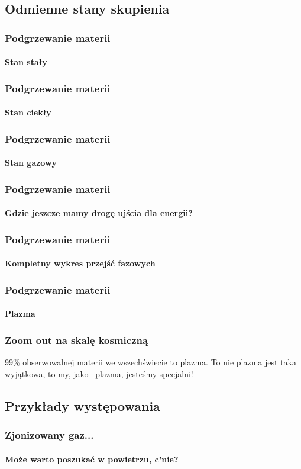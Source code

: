 \documentclass{beamer}
\begin{document}
  \subsection{Odmienne stany skupienia}
  \begin{frame}
    \frametitle{Podgrzewanie materii}
    \framesubtitle{Stan stały}
  \end{frame}

  \begin{frame}
    \frametitle{Podgrzewanie materii}
    \framesubtitle{Stan ciekły}
  \end{frame}


  \begin{frame}
    \frametitle{Podgrzewanie materii}
    \framesubtitle{Stan gazowy}
    \pause
  \end{frame}


  \begin{frame}
    \frametitle{Podgrzewanie materii}
    \framesubtitle{Gdzie jeszcze mamy drogę ujścia dla energii?}
  \end{frame}


  \begin{frame}
    \frametitle{Podgrzewanie materii}
    \framesubtitle{Kompletny wykres przejść fazowych}
  \end{frame}


  \begin{frame}
    \frametitle{Podgrzewanie materii}
    \framesubtitle{Plazma}
    \pause
  \end{frame}


  \begin{frame}
    \frametitle{Zoom out na skalę kosmiczną}
    99\% obserwowalnej materii we wszechświecie to plazma.
    \pause
    \pause
    To nie plazma jest taka wyjątkowa, to my, jako ~plazma, jesteśmy specjalni!
  \end{frame}

\subsection{Przykłady występowania}

\begin{frame}
  \frametitle{Zjonizowany gaz...}
  \framesubtitle{Może warto poszukać w powietrzu, c'nie?}
\end{frame}
\end{document}
